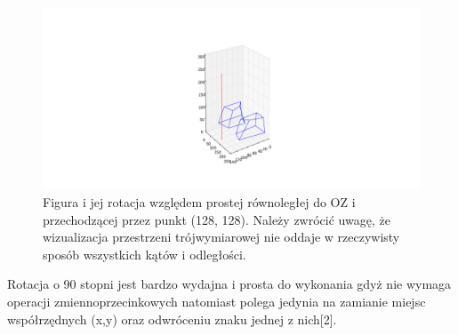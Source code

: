 \begin{figure}[!ht]
\centerline{
\includegraphics[scale=0.75]{images/3d_12}}
\caption{Figura i jej rotacja względem prostej równoległej do OZ i przechodzącej przez punkt (128, 128). Należy zwrócić uwagę, że wizualizacja przestrzeni trójwymiarowej nie oddaje w rzeczywisty sposób wszystkich kątów i odległości.}
\end{figure}
Rotacja o 90 stopni jest bardzo wydajna i prosta do wykonania gdyż nie wymaga operacji zmiennoprzecinkowych natomiast polega jedynia na zamianie miejsc współrzędnych (x,y) oraz odwróceniu znaku jednej z nich[2].
